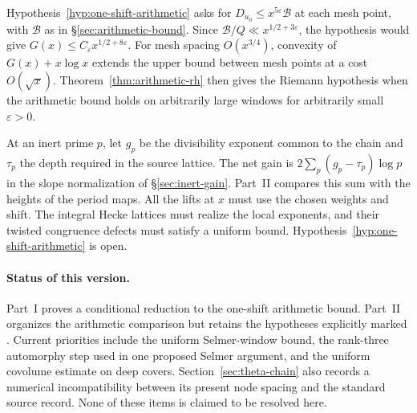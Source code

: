 Hypothesis~\ref{hyp:one-shift-arithmetic} asks for
$D_{u_0}\le x^{5\varepsilon}\mathcal B$ at each mesh point, with
$\mathcal B$ as in \S\ref{sec:arithmetic-bound}. Since
$\mathcal B/Q\ll x^{1/2+3\varepsilon}$, the hypothesis would give
$G(x)\le C_\varepsilon x^{1/2+8\varepsilon}$. For mesh spacing
$O(x^{3/4})$, convexity of $G(x)+x\log x$ extends the upper bound
between mesh points at a cost $O(\sqrt x)$. Theorem~\ref{thm:arithmetic-rh}
then gives the Riemann hypothesis when the arithmetic bound holds on
arbitrarily large windows for arbitrarily small $\varepsilon>0$.

At an inert prime $p$, let $g_p$ be the divisibility exponent common
to the chain and $\tau_p$ the depth required in the source lattice.
The net gain is $2\sum_p(g_p-\tau_p)\log p$ in the slope normalization
of \S\ref{sec:inert-gain}. Part~II compares this sum with the heights
of the period maps. All the lifts at $x$ must use the chosen weights
and shift. The integral Hecke lattices must realize the local
exponents, and their twisted congruence defects must satisfy a
uniform bound. Hypothesis~\ref{hyp:one-shift-arithmetic} is open.

\paragraph{Status of this version.}
Part~I proves a conditional reduction to the one-shift arithmetic
bound. Part~II organizes the arithmetic comparison but retains the
hypotheses explicitly marked \openinput. Current priorities include the
uniform Selmer-window bound, the rank-three automorphy step used in one
proposed Selmer argument, and the uniform covolume estimate on deep
covers. Section~\ref{sec:theta-chain} also records a numerical
incompatibility between its present node spacing and the standard
source record. None of these items is claimed to be resolved here.
